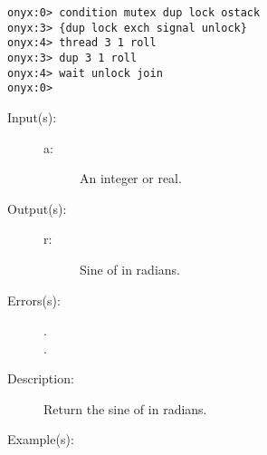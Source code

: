 \begin{description}
\begin{description}
\begin{verbatim}
onyx:0> condition mutex dup lock ostack
onyx:3> {dup lock exch signal unlock}
onyx:4> thread 3 1 roll
onyx:3> dup 3 1 roll
onyx:4> wait unlock join
onyx:0>
		\end{verbatim}
	\end{description}
\label{systemdict:sin}
\item[{\onyxop{a}{sin}{r}}: ]
	\begin{description}\item[]
	\item[Input(s): ]
		\begin{description}\item[]
		\item[a: ]
			An integer or real.
		\end{description}
	\item[Output(s): ]
		\begin{description}\item[]
		\item[r: ]
			Sine of  in radians.
		\end{description}
	\item[Errors(s): ]
		\begin{description}\item[]
		\item[.]
		\item[.]
		\end{description}
	\item[Description: ]
		Return the sine of  in radians.
	\item[Example(s): ]\begin{verbatim}


\end{verbatim}
\end{description}
\end{description}
